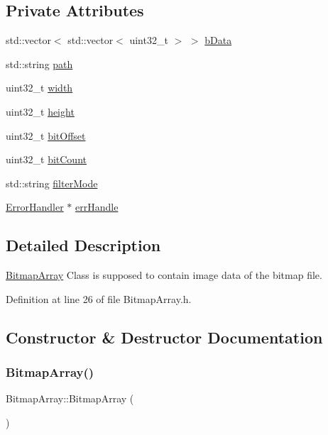 \subsection*{Private Attributes}
\begin{DoxyCompactItemize}
\item 
std\+::vector$<$ std\+::vector$<$ uint32\+\_\+t $>$ $>$ \mbox{\hyperlink{classBitmapArray_a4af158b9be17ce7ebeab8729c2b34ab2}{b\+Data}}
\item 
std\+::string \mbox{\hyperlink{classBitmapArray_a3a3e1fbdd198c6731c7f6e20fb492445}{path}}
\item 
uint32\+\_\+t \mbox{\hyperlink{classBitmapArray_a44f51b2c1ecde3f9aa504df25d65b6c9}{width}}
\item 
uint32\+\_\+t \mbox{\hyperlink{classBitmapArray_adb8d1a8fcc55c3884ad3eea71c6042be}{height}}
\item 
uint32\+\_\+t \mbox{\hyperlink{classBitmapArray_abcab200a1eb84331f7c79702e9199694}{bit\+Offset}}
\item 
uint32\+\_\+t \mbox{\hyperlink{classBitmapArray_a18127e27d4b1477fd46ef0c0b3dbc110}{bit\+Count}}
\item 
std\+::string \mbox{\hyperlink{classBitmapArray_adfd3e5a1eed42e37b22a4f2f2560ad67}{filter\+Mode}}
\item 
\mbox{\hyperlink{classErrorHandler}{Error\+Handler}} $\ast$ \mbox{\hyperlink{classBitmapArray_a8d95e8cb2bf8c0f618465a389e8ffe4d}{err\+Handle}}
\end{DoxyCompactItemize}


\subsection{Detailed Description}
\mbox{\hyperlink{classBitmapArray}{Bitmap\+Array}} Class is supposed to contain image data of the bitmap file. 

Definition at line 26 of file Bitmap\+Array.\+h.



\subsection{Constructor \& Destructor Documentation}
\mbox{\label{classBitmapArray_a582e5e54ec078d30fde87ae7b4540f32}} 
\subsubsection{\texorpdfstring{BitmapArray()}{BitmapArray()}\hspace{0.1cm}{\footnotesize\ttfamily [1/3]}}
{\footnotesize\ttfamily Bitmap\+Array\+::\+Bitmap\+Array (\begin{DoxyParamCaption}{ }\end{DoxyParamCaption})}



